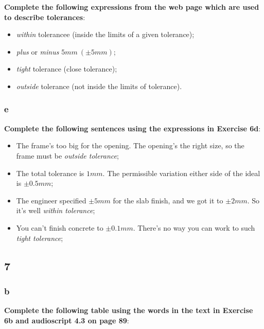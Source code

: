 \textbf{Complete the following expressions from the web page which are used to describe tolerances}:

\begin{itemize}

\item \textit{within} tolerancee (inside the limits of a given tolerance);
\item \textit{plus} or \textit{minus} $5mm\ (\pm 5mm)$;
\item \textit{tight} tolerance (close tolerance);
\item \textit{outside} tolerance (not inside the limits of tolerance).

\end{itemize}

\subsubsection{e}

\textbf{Complete the following sentences using the expressions in Exercise 6d}:

\begin{itemize}

\item The frame's too big for the opening. The opening's the right size, so the frame must be \textit{outside tolerance};
\item The total tolerance is $1mm$. The permissible variation either side of the ideal is $\pm 0.5mm$;
\item The engineer specified $\pm 5mm$ for the slab finish, and we got it to $\pm 2mm$. So it's well \textit{within tolerance};
\item You can't finish concrete to $\pm 0.1mm$. There's no way you can work to such \textit{tight tolerance};

\end{itemize}

\subsection{7}

\subsubsection{b}

\textbf{Complete the following table using the words in the text in Exercise 6b and audioscript 4.3 on page 89}:

